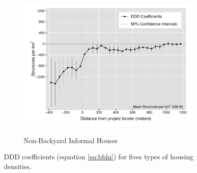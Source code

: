 \documentclass[12pt]{article}
\begin{document}
\begin{figure}[t!]
\begin{subfigure}[b]{0.49\textwidth}
        \label{fig:DDDbackyard}
    \end{subfigure}
    \vskip 1mm \vskip 0pt
    \begin{subfigure}[b]{.49\textwidth}  
        \centering
        \caption[]{\small Non-Backyard Informal Houses} 
        \vspace{-1mm}
        \includegraphics[width=\textwidth,trim={.5cm .3cm .3cm 0cm}, clip=true]{figures/distplotDDD_bblu_inf_non_backyard_admin_3}    
        \label{fig:DDDnonbackyard}
    \end{subfigure}
    \hfill \hspace{.02\textwidth}
    \begin{minipage}{0.47\textwidth}   
    \vspace{-6cm}
    \caption[]
    {\small DDD coefficients (equation \ref{eq:bblu}) for fives types of housing densities.} \label{fig:DDDbblu}
	\end{minipage}
\end{figure} 
\end{document}
